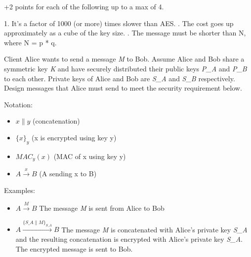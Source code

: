 \documentclass[addpoints,answers]{exam}
\begin{document}
\begin{questions}
\begin{parts}
\begin{solutionorbox}[2in]
+2 points for each of the following up to a max of 4.

1. It's a factor of 1000 (or more) times slower than AES. . The cost goes up approximately as a cube of the key size. . The message must be shorter than N, where N = p * q.
\end{solutionorbox}

\end{parts}

\pagebreak


Client Alice wants to send a message \textit{M} to Bob. Assume Alice
and Bob share a symmetric key \textit{K} and have securely distributed
their public keys \textit{P\_A} and \textit{P\_B} to each
other. Private keys of Alice and Bob are \textit{S\_A} and
\textit{S\_B} respectively. Design messages that Alice must send to
meet the security requirement below.

Notation: 
\begin{itemize}
\item $x \parallel y$ (concatenation) 
\item $\{x\}_y$ (x is encrypted using key y) 
\item $MAC_y(x)$ (MAC of x using key y) 
\item $A \xrightarrow{x} B$ (A sending x to B)
\end{itemize}

Examples:
\begin{itemize}
\item $A \xrightarrow{M} B$ The message \textit{M} is sent from Alice to Bob
\item $A \xrightarrow{\{S\_A \parallel M\}_{S\_A}} B$ The message
  \textit{M} is concatenated with Alice's private key \textit{S\_A}
  and the resulting concatenation is encrypted with Alice's private
  key \textit{S\_A}. The encrypted message is sent to Bob.
\end{itemize}

\end{questions}
\end{document}
